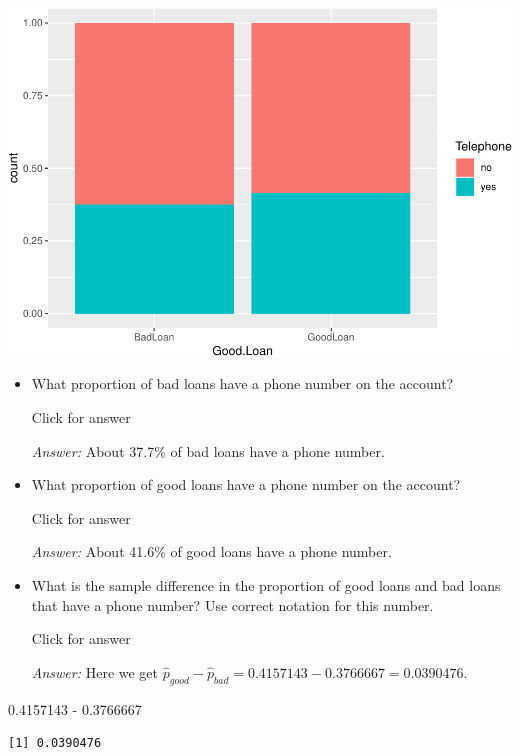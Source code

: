 \documentclass[
]{book}
\newenvironment{Shaded}{\begin{snugshade}}{\end{snugshade}}
\newcommand{\FloatTok}[1]{\textcolor[rgb]{0.00,0.00,0.81}{#1}}
\newcommand{\SpecialCharTok}[1]{\textcolor[rgb]{0.00,0.00,0.00}{#1}}
\providecommand{\tightlist}{%
  \setlength{\itemsep}{0pt}\setlength{\parskip}{0pt}}
\begin{document}
\includegraphics[width=1\linewidth]{Class_Activity_8_files/figure-latex/unnamed-chunk-9-1}

\begin{itemize}
\tightlist
\item
  What proportion of bad loans have a phone number on the account?

  Click for answer

  \emph{Answer:} About 37.7\% of bad loans have a phone number.
\item
  What proportion of good loans have a phone number on the account?

  Click for answer

  \emph{Answer:} About 41.6\% of good loans have a phone number.
\item
  What is the sample difference in the proportion of good loans and bad loans that have a phone number? Use correct notation for this number.

  Click for answer

  \emph{Answer:} Here we get \(\hat{p}_{good} - \hat{p}_{bad} =0.4157143 - 0.3766667 = 0.0390476\).
\end{itemize}

\begin{Shaded}
\begin{Highlighting}[]
\FloatTok{0.4157143} \SpecialCharTok{{-}} \FloatTok{0.3766667}
\end{Highlighting}
\end{Shaded}

\begin{verbatim}
[1] 0.0390476
\end{verbatim}
\end{document}
